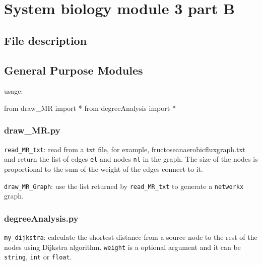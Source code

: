 \documentclass[]{article}
\date{}
\newenvironment{Shaded}{}{}
\newcommand{\ImportTok}[1]{#1}
\newcommand{\OperatorTok}[1]{\textcolor[rgb]{0.40,0.40,0.40}{#1}}
\newcommand{\NormalTok}[1]{#1}
\begin{document}
\hypertarget{header-n114}{%
\section{System biology module 3 part B}\label{header-n114}}

\hypertarget{header-n116}{%
\subsection{File description}\label{header-n116}}

\hypertarget{header-n119}{%
\subsection{General Purpose Modules}\label{header-n119}}

usage:

\begin{Shaded}
\begin{Highlighting}[]
\ImportTok{from}\NormalTok{ draw_MR }\ImportTok{import} \OperatorTok{*}
\ImportTok{from}\NormalTok{ degreeAnalysis }\ImportTok{import} \OperatorTok{*}
\end{Highlighting}
\end{Shaded}

\hypertarget{header-n123}{%
\subsubsection{draw\_MR.py}\label{header-n123}}

\texttt{read\_MR\_txt}: read from a txt file, for example,
fructoseanaerobicfluxgraph.txt and return the list of edges \texttt{el}
and nodes \texttt{nl} in the graph. The size of the nodes is
proportional to the sum of the weight of the edges connect to it.

\texttt{draw\_MR\_Graph}: use the list returned by
\texttt{read\_MR\_txt} to generate a \texttt{networkx} graph.

\hypertarget{header-n131}{%
\subsubsection{degreeAnalysis.py}\label{header-n131}}

\texttt{my\_dijkstra}: calculate the shortest distance from a source
node to the rest of the nodes using Dijkstra algorithm. \texttt{weight}
is a optional argument and it can be \texttt{string}, \texttt{int} or
\texttt{float}.
\end{document}
